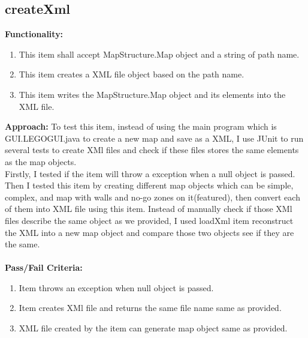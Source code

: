 \documentclass[12pt, a4paper]{report}
\begin{document}
\subsection{createXml}
\textbf{Functionality:}
\begin{enumerate}
	\item This item shall accept MapStructure.Map object and a string of path name.
	\item This item creates a XML file object based on the path name.
	\item This item writes the MapStructure.Map object and its elements into the XML file.
\end{enumerate}
\textbf{Approach:}
To test this item, instead of using the main program which is GUI.LEGOGUI.java to create a new map and save as a XML, I use JUnit to run several tests to create XMl files and check if these files stores the same elements as the map objects.\\
Firstly, I tested if the item will throw a exception when a null object is passed. Then I tested this item by creating different map objects which can be simple, complex, and map with walls and no-go zones on it(featured), then convert each of them into XML file using this item. Instead of manually check if those XMl files describe the same object as we provided, I used loadXml item reconstruct the XML into a new map object and compare those two objects see if they are the same.\\
\textbf{\\Pass/Fail Criteria: }
\begin{enumerate}
	\item Item throws an exception when null object is passed.
	\item Item creates XMl file and returns the same file name same as provided.
	\item XML file created by the item can generate map object same as provided.\\
\end{enumerate}
\end{document}
